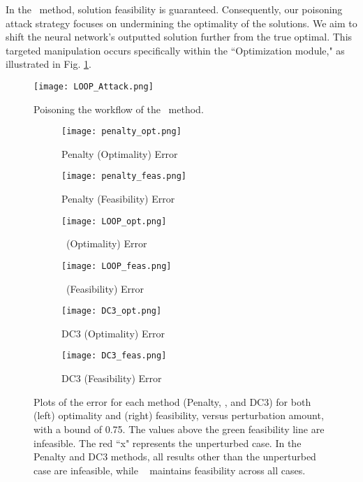  In the \LOOPLC~method, solution feasibility is guaranteed. Consequently, our poisoning attack strategy focuses on undermining the optimality of the solutions. We aim to shift the neural network's outputted solution further from the true optimal. This targeted manipulation occurs specifically within the ``Optimization module," as illustrated in Fig. \ref{loopfig}.

\begin{figure}[h!]
\centerline{\texttt{[image: LOOP\_Attack.png]}}
\vspace{-.2cm}
\caption{Poisoning the workflow of the \LOOPLC~method.}
\label{loopfig}
\end{figure}



\captionsetup{skip=5pt} %

\begin{figure*}[h!]
\centering
\begin{subfigure}{0.45\linewidth}
    \texttt{[image: penalty\_opt.png]}
    \caption{Penalty (Optimality) Error}
\end{subfigure}\hfill
\begin{subfigure}{0.45\linewidth}
    \texttt{[image: penalty\_feas.png]}
    \caption{Penalty (Feasibility) Error}
\end{subfigure}

\vspace{10pt} %

\begin{subfigure}{0.45\linewidth}
    \texttt{[image: LOOP\_opt.png]}
    \caption{\LOOPLC~(Optimality) Error}
\end{subfigure}\hfill
\begin{subfigure}{0.45\linewidth}
    \texttt{[image: LOOP\_feas.png]}
    \caption{\LOOPLC~(Feasibility) Error}
\end{subfigure}

\vspace{10pt} %

\begin{subfigure}{0.45\linewidth}
    \texttt{[image: DC3\_opt.png]}
    \caption{DC3 (Optimality) Error}
\end{subfigure}\hfill
\begin{subfigure}{0.45\linewidth}
    \texttt{[image: DC3\_feas.png]}
    \caption{DC3 (Feasibility) Error}
\end{subfigure}

\caption{Plots of the error for each method (Penalty, \LOOPLC, and DC3) for both (left) optimality and (right) feasibility, versus perturbation amount, with a bound of 0.75. The values above the green feasibility line are infeasible. The red ``x" represents the unperturbed case. In the Penalty and DC3 methods, all results other than the unperturbed case are infeasible, while \LOOPLC~ maintains feasibility across all cases.}
\label{fig:all_methods}
\vspace{-0.3cm}
\end{figure*}


